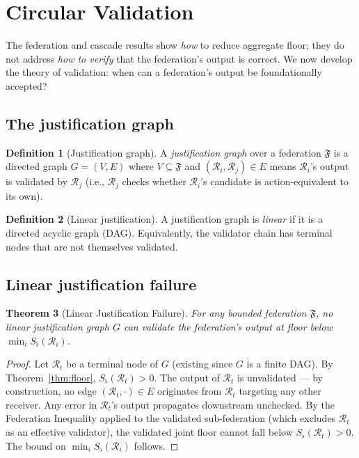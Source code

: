 \documentclass[11pt,twocolumn,a4paper]{article}
\newtheorem{theorem}{Theorem}[section]
\theoremstyle{definition}
\newtheorem{definition}[theorem]{Definition}
\theoremstyle{remark}
\newcommand{\Federation}{\mathfrak{F}}
\newcommand{\receiver}{\mathcal{R}}
\newcommand{\Sfloor}{S_{\flat}}
\begin{document}
\begin{figure}[!htbp]
\end{figure}

\section{Circular Validation}
\label{sec:circular}

The federation and cascade results show \emph{how} to reduce aggregate floor; they do not address \emph{how to verify} that the federation's output is correct. We now develop the theory of validation: when can a federation's output be foundationally accepted?

\subsection{The justification graph}

\begin{definition}[Justification graph]
\label{def:justification}
A \emph{justification graph} over a federation $\Federation$ is a directed graph $G = (V, E)$ where $V \subseteq \Federation$ and $(\receiver_i, \receiver_j) \in E$ means $\receiver_i$'s output is validated by $\receiver_j$ (i.e., $\receiver_j$ checks whether $\receiver_i$'s candidate is action-equivalent to its own).
\end{definition}

\begin{definition}[Linear justification]
\label{def:linear}
A justification graph is \emph{linear} if it is a directed acyclic graph (DAG). Equivalently, the validator chain has terminal nodes that are not themselves validated.
\end{definition}

\subsection{Linear justification failure}

\begin{theorem}[Linear Justification Failure]
\label{thm:linear-fail}
For any bounded federation $\Federation$, no linear justification graph $G$ can validate the federation's output at floor below $\min_i \Sfloor(\receiver_i)$.
\end{theorem}

\begin{proof}
Let $\receiver_t$ be a terminal node of $G$ (existing since $G$ is a finite DAG). By Theorem~\ref{thm:floor}, $\Sfloor(\receiver_t) > 0$. The output of $\receiver_t$ is unvalidated --- by construction, no edge $(\receiver_t, \cdot) \in E$ originates from $\receiver_t$ targeting any other receiver. Any error in $\receiver_t$'s output propagates downstream unchecked. By the Federation Inequality applied to the validated sub-federation (which excludes $\receiver_t$ as an effective validator), the validated joint floor cannot fall below $\Sfloor(\receiver_t) > 0$. The bound on $\min_i \Sfloor(\receiver_i)$ follows.
\end{proof}
\end{document}
